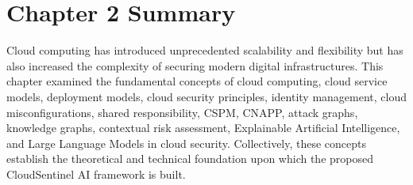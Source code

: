 \section{Chapter 2 Summary}

Cloud computing has introduced unprecedented scalability and flexibility but has also increased the complexity of securing modern digital infrastructures. This chapter examined the fundamental concepts of cloud computing, cloud service models, deployment models, cloud security principles, identity management, cloud misconfigurations, shared responsibility, CSPM, CNAPP, attack graphs, knowledge graphs, contextual risk assessment, Explainable Artificial Intelligence, and Large Language Models in cloud security. Collectively, these concepts establish the theoretical and technical foundation upon which the proposed CloudSentinel AI framework is built.
